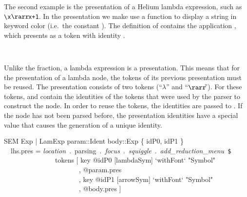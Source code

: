 
The second example is the presentation of a Helium lambda expression, such as \verb|\x|$\rarr\!$\verb|x+1|. In the presentation we make  use a function  to display a string in keyword color (i.e.\ the constant ). The definition of  contains the application , which  presents  as a token with identity .

\begin{small}
\\
\end{small}

Unlike the fraction, a lambda expression is a  presentation. This means that for the presentation of a lambda node, the tokens of its previous presentation must be reused. The presentation consists of two tokens (``$\lambda$'' and ``$\rarr\!\!$''). For these tokens,  and  contain the identities of the tokens that were used by the parser to construct the node. In order to reuse the tokens, the identities are passed to . If the node has not been parsed before, the presentation identities have a special value that causes the generation of a unique identity. 



\ttfamily\begin{small}\begin{tabbing}
SEM Exp | LamExp param::Ident body::Exp \{ idP0, idP1 \} \\
~~lhs.pres = {\em location}~.~parsing~.~{\em focus}~.~{\em squiggle}~.~{\em add\_reduction\_menu}~\verb|$|\\
~~~~~~~~~~~~~~~tokens [ key @idP0 [lambdaSym] `withFont` "Symbol"\\ %
~~~~~~~~~~~~~~~~~~~~~~, @param.pres\\
~~~~~~~~~~~~~~~~~~~~~~, key @idP1 [arrowSym] `withFont` "Symbol"\\ %
~~~~~~~~~~~~~~~~~~~~~~, @body.pres ] \\
\end{tabbing}\end{small}\rmfamily


